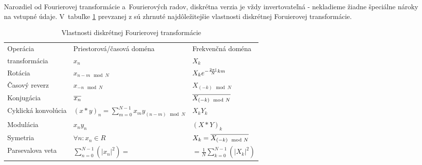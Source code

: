 Narozdiel od Fourierovej transformácie a~Fourierových radov, diskrétna
verzia je vždy invertovateľná - nekladieme žiadne špeciálne nároky na
vstupné údaje.
V~tabuľke \ref{tab:dft_properties} prevzanej z \cite{dft_properties}
sú zhrnuté najdôležitejšie vlastnosti diskrétnej Foruierovej
transformácie.
\begin{table}
    \centering
    \renewcommand{\arraystretch}{1.5}
    \begin{tabular}{lll}
    Operácia&Priestorová/časová doména&Frekvenčná doména\\
    transformácia&$x_n$&$X_k$\\
    Rotácia&$x_{n-m \mod N}$&$X_k e^{-\frac{2 \pi\hat{\imath}}{N} k m}$\\
    Časový reverz&$x_{-n \mod N}$&
        $X_{(-k) \mod N}$\\
    Konjugácia&$\overline{x_n}$&
        $\overline{X_{(-k) \mod N}}$\\
    Cyklická konvolúcia&
        $(x*y)_n= \sum_{m=0}^{N-1} x_m y_{(n-m)\mod N}$&
        $X_k Y_k$\\
    Modulácia&
        $x_n y_n$& $ (X*Y)_k$\\
    Symetria&
        $\forall n:x_n\in R$&
        $X_k = \overline{X_{(-k)\mod N}}$\\
    Parsevalova veta&
        $\displaystyle \sum_{n=0}^{N-1}( |x_n|^2)=$&
        $\displaystyle =\frac{1}{N} \sum_{k=0}^{N-1}(|X_k|^2)$
    \end{tabular}

    \caption{Vlastnosti diskrétnej Fourierovej transformácie}
    \label{tab:dft_properties}

    \renewcommand{\arraystretch}{1.0}
\end{table}
